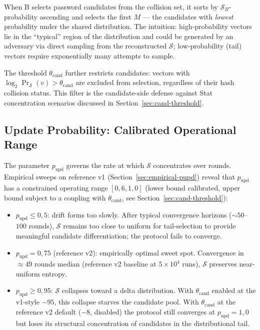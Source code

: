 \documentclass[11pt,a4paper]{article}
\begin{document}
When B selects password candidates from the collision set, it sorts by $\mathcal{S}_B$-probability ascending and selects the first $M$ --- the candidates with \emph{lowest} probability under the shared distribution. The intuition: high-probability vectors lie in the ``typical'' region of the distribution and could be generated by an adversary via direct sampling from the reconstructed $\mathcal{S}$; low-probability (tail) vectors require exponentially many attempts to sample.

The threshold $\theta_{\text{cand}}$ further restricts candidates: vectors with $\log_2 \Pr_\mathcal{S}(v) > \theta_{\text{cand}}$ are excluded from selection, regardless of their hash collision status. This filter is the candidate-side defense against Stat concentration scenarios discussed in Section~\ref{sec:cand-threshold}.

\subsection{Update Probability: Calibrated Operational Range}\label{sec:p-upd}

The parameter $p_\text{upd}$ governs the rate at which $\mathcal{S}$ concentrates over rounds. Empirical sweeps on reference v1 (Section~\ref{sec:empirical-pupd}) reveal that $p_\text{upd}$ has a constrained operating range $[0{,}6, 1{,}0]$ (lower bound calibrated, upper bound subject to a coupling with $\theta_{\text{cand}}$, see Section~\ref{sec:cand-threshold}):

\begin{itemize}[leftmargin=*]
\item $p_\text{upd} \leq 0{,}5$: drift forms too slowly. After typical convergence horizons ($\sim 50$--$100$ rounds), $\mathcal{S}$ remains too close to uniform for tail-selection to provide meaningful candidate differentiation; the protocol fails to converge.
\item $p_\text{upd} = 0{,}75$ (reference v2): empirically optimal sweet spot. Convergence in $\approx 49$ rounds median (reference v2 baseline at $5 \times 10^4$ runs), $\mathcal{S}$ preserves near-uniform entropy.
\item $p_\text{upd} \geq 0{,}95$: $\mathcal{S}$ collapses toward a delta distribution. With $\theta_{\text{cand}}$ enabled at the v1-style $-95$, this collapse starves the candidate pool. With $\theta_{\text{cand}}$ at the reference v2 default ($-8$, disabled) the protocol still converges at $p_\text{upd} = 1{,}0$ but loses its structural concentration of candidates in the distributional tail.
\end{itemize}
\end{document}
